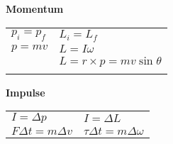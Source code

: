\documentclass[12pt]{article}
\begin{document}
%
%
\begin{minipage}[t]{.5\textwidth}
\textbf{Momentum} \\[6pt]
\begin{tabular}{p{4cm} p{6cm}}
	$p_i = p_f$ & $L_i = L_f$ \\[6pt]	
	$p = mv$ & $L = I\omega$ \\[6pt]
	& $L = r \times p = mv \sin \theta $\\[6pt]
	\\[6pt]
\end{tabular}
\end{minipage}
%
%
\begin{minipage}[t]{.5\textwidth}
\textbf{Impulse} \\[6pt]
\begin{tabular}{p{4cm} p{6cm}}
	$I = \Delta p$ & $I = \Delta L$ \\[6pt]
	$F\Delta t = m \Delta v$ & $\tau \Delta t = m \Delta \omega $\\[6pt]	




\end{tabular}	
\end{minipage}
\end{document}
